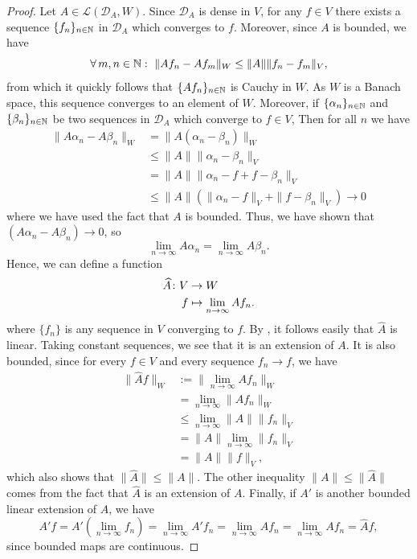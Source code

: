 \begin{proof}
  Let $A\in \mathcal{L}(\mathcal{D}_A,W)$. Since $\mathcal{D}_A$
  is dense in $V$, for any $f\in V$ there exists a sequence
  $\{f_n\}_{n\in \mathbb{N}}$ in $\mathcal{D}_A$ which converges to $f$.
  Moreover, since $A$ is bounded, we have 
  \begin{equation*}
  \forall \, m,n\in \mathbb{N} : \ \|Af_n-Af_m\|_W \leq \|A\| \|f_n-f_m\|_V,
  \end{equation*}
  from which it quickly follows that $\{Af_n\}_{n\in \mathbb{N}}$ is Cauchy in
  $W$. As $W$ is a Banach space, this sequence converges to an element
  of $W$.
  Moreover, if
  $\{\alpha_n\}_{n\in \mathbb{N}}$ and $\{\beta_n\}_{n\in \mathbb{N}}$ be two
  sequences in $\mathcal{D}_A$ which converge to $f\in V$,
  Then for all \(n\) we have
  \begin{align*}
    \|A\alpha_n-A\beta_n\|_W
    & = \|A(\alpha_n-\beta_n)\|_W\\
    &\leq \|A\| \| \alpha_n-\beta_n\|_V\\
    & = \|A\| \| \alpha_n-f+f-\beta_n\|_V\\
    &\leq \|A\| (\| \alpha_n-f\|_V+\|f-\beta_n\|_V) \to 0
  \end{align*}
  where we have used the fact that $A$ is bounded.
  Thus, we have shown that \((A\alpha_n-A\beta_n)\to 0\), so
  \begin{equation*}
  \lim_{n\to\infty}A\alpha_n = \lim_{n\to\infty}A\beta_n.
  \end{equation*}
  Hence, we can define a function
  \begin{align*}
  \widehat A \colon V &\to W\\
  f & \mapsto \lim_{n\to\infty}Af_n.
  \end{align*}
  where \(\{f_n\}\) is any sequence in \(V\) converging to \(f\).
  By , it follows easily that \(\widehat A\) is
  linear. Taking constant sequences, we see that it is an extension of
  \(A\).
  It is also bounded, since for every \(f\in V\) and every sequence
  \(f_n\to f\), we have
  \begin{align*}
  \|\widehat A f\|_W
    &:= \bigl\|\lim_{n\to\infty}Af_n\bigr\|_W\\
    &= \lim_{n\to\infty}\|Af_n\|_W\\
    & \leq\lim_{n\to\infty}\|A\|\|f_n\|_V\\
    & = \|A\|\lim_{n\to\infty}\|f_n\|_V\\
    & = \|A\|\|f\|_V,
  \end{align*}
  which also shows that \(\|\widehat A\|\leq\|A\|\).
  The other inequality \(\|A\|\leq\|\widehat A\|\) comes from the fact
  that \(\widehat A\) is an extension of \(A\).
  Finally, if \(A'\) is another bounded linear extension of \(A\), we
  have
  \begin{equation}
    A'f
    = A'(\lim_{n\to\infty}f_n)
    = \lim_{n\to\infty}A'f_n
    = \lim_{n\to\infty}Af_n
    = \lim_{n\to\infty}Af_n
    = \widehat Af
  ,\end{equation}
  since bounded maps are continuous.
\end{proof}

